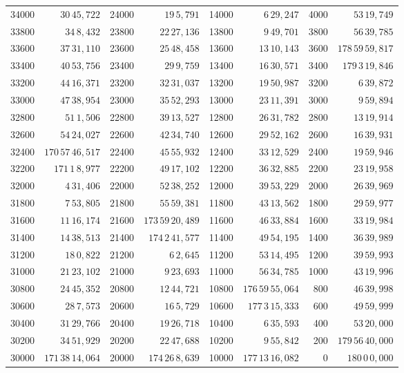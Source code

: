 \begin{tabular}{|r|r||r|r||r|r||r|r|}
34000 & \(30\,45,\!722\) & 24000 & \(19\,5,\!791\) & 14000 & \(6\,29,\!247\) & 4000 & \(53\,19,\!749\) \\[1pt]
33800 & \(34\,8,\!432\) & 23800 & \(22\,27,\!136\) & 13800 & \(9\,49,\!701\) & 3800 & \(56\,39,\!785\) \\
33600 & \(37\,31,\!110\) & 23600 & \(25\,48,\!458\) & 13600 & \(13\,10,\!143\) & 3600 & \(178\,59\,59,\!817\) \\
33400 & \(40\,53,\!756\) & 23400 & \(29\,9,\!759\) & 13400 & \(16\,30,\!571\) & 3400 & \(179\,3\,19,\!846\) \\
33200 & \(44\,16,\!371\) & 23200 & \(32\,31,\!037\) & 13200 & \(19\,50,\!987\) & 3200 & \(6\,39,\!872\) \\
33000 & \(47\,38,\!954\) & 23000 & \(35\,52,\!293\) & 13000 & \(23\,11,\!391\) & 3000 & \(9\,59,\!894\) \\[1pt]
32800 & \(51\,1,\!506\) & 22800 & \(39\,13,\!527\) & 12800 & \(26\,31,\!782\) & 2800 & \(13\,19,\!914\) \\
32600 & \(54\,24,\!027\) & 22600 & \(42\,34,\!740\) & 12600 & \(29\,52,\!162\) & 2600 & \(16\,39,\!931\) \\
32400 & \(170\,57\,46,\!517\) & 22400 & \(45\,55,\!932\) & 12400 & \(33\,12,\!529\) & 2400 & \(19\,59,\!946\) \\
32200 & \(171\,1\,8,\!977\) & 22200 & \(49\,17,\!102\) & 12200 & \(36\,32,\!885\) & 2200 & \(23\,19,\!958\) \\
32000 & \(4\,31,\!406\) & 22000 & \(52\,38,\!252\) & 12000 & \(39\,53,\!229\) & 2000 & \(26\,39,\!969\) \\[1pt]
31800 & \(7\,53,\!805\) & 21800 & \(55\,59,\!381\) & 11800 & \(43\,13,\!562\) & 1800 & \(29\,59,\!977\) \\
31600 & \(11\,16,\!174\) & 21600 & \(173\,59\,20,\!489\) & 11600 & \(46\,33,\!884\) & 1600 & \(33\,19,\!984\) \\
31400 & \(14\,38,\!513\) & 21400 & \(174\,2\,41,\!577\) & 11400 & \(49\,54,\!195\) & 1400 & \(36\,39,\!989\) \\
31200 & \(18\,0,\!822\) & 21200 & \(6\,2,\!645\) & 11200 & \(53\,14,\!495\) & 1200 & \(39\,59,\!993\) \\
31000 & \(21\,23,\!102\) & 21000 & \(9\,23,\!693\) & 11000 & \(56\,34,\!785\) & 1000 & \(43\,19,\!996\) \\[1pt]
30800 & \(24\,45,\!352\) & 20800 & \(12\,44,\!721\) & 10800 & \(176\,59\,55,\!064\) & 800 & \(46\,39,\!998\) \\
30600 & \(28\,7,\!573\) & 20600 & \(16\,5,\!729\) & 10600 & \(177\,3\,15,\!333\) & 600 & \(49\,59,\!999\) \\
30400 & \(31\,29,\!766\) & 20400 & \(19\,26,\!718\) & 10400 & \(6\,35,\!593\) & 400 & \(53\,20,\!000\) \\
30200 & \(34\,51,\!929\) & 20200 & \(22\,47,\!688\) & 10200 & \(9\,55,\!842\) & 200 & \(179\,56\,40,\!000\) \\
30000 & \(171\,38\,14,\!064\) & 20000 & \(174\,26\,8,\!639\) & 10000 & \(177\,13\,16,\!082\) & 0 & \(180\,0\,0,\!000\) \\
\hline
\end{tabular}\par
\endgroup
\clearpage
